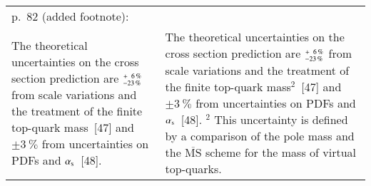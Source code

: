 \documentclass[fontsize=11pt, paper=a4]{scrartcl}
\begin{document}
\begin{center}
\begin{tabular}{p{}@{\hskip 0.05\textwidth}p{}}
  p.\ 82 (added footnote): &\\
  The theoretical uncertainties on the cross section prediction are $^{\hspace{0.25pt}+\hspace{0.25pt}\phantom{0}6\,\%}_{-23\,\%}$ from scale variations and the treatment of the finite top-quark mass~[47] and $\pm\SI{3}{\percent}$ from uncertainties on PDFs and $\alpha_{\text{s}}$~[48]. &
 The theoretical uncertainties on the cross section prediction are $^{\hspace{0.25pt}+\hspace{0.25pt}\phantom{0}6\,\%}_{-23\,\%}$ from scale variations and the treatment of the finite top-quark mass$^2$~[47] and $\pm\SI{3}{\percent}$ from uncertainties on PDFs and $\alpha_{\text{s}}$~[48].\newline
 {\footnotesize $^2$ This uncertainty is defined by a comparison of the pole mass and the $\overline{\text{MS}}$ scheme for the mass of virtual top-quarks.}\\

  \bottomrule
\end{tabular}
\end{center}




\end{document}
